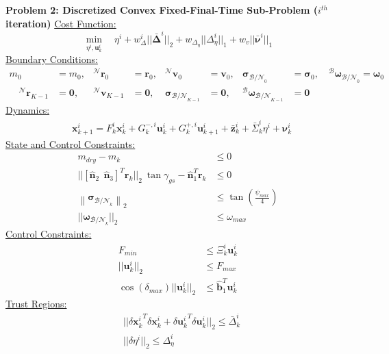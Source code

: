 \clearpage
\begin{mdframed}
\label{problem2}
\textbf{Problem 2: Discretized Convex Fixed-Final-Time Sub-Problem ($i^{th}$ iteration)}
\underline{Cost Function:}
\begin{equation*}
\min_{\eta^i, \mathbf{u}_k^i} \quad \eta^i + w_\Delta^i || \bm{\bar{\Delta}}^i ||_2 + w_{\Delta_\eta} || \Delta_\eta^i ||_1 + w_v || \bar{\bm{\nu}}^i ||_1
\end{equation*}
%
\underline{Boundary Conditions:}  
\begin{align*}
m_0 &= m_0, &^\mathcal{N}\mathbf{r}_0 &= \mathbf{r}_0, & ^\mathcal{N}\mathbf{v}_0 &= \mathbf{v}_0, & \boldsymbol{\sigma}_{\mathcal{B/N}_0} &= {\boldsymbol{\sigma}_0}, \quad ^\mathcal{B}\boldsymbol{\omega}_{\mathcal{B/N}_0} = \boldsymbol{\omega}_0 \\
\quad ^\mathcal{N}\mathbf{r}_{K-1} &= \mathbf{0}, & ^\mathcal{N}\mathbf{v}_{K-1} &= \mathbf{0}, & \boldsymbol{\sigma}_{\mathcal{B/N}_{K-1}} &= \mathbf{0}, & ^\mathcal{B}\boldsymbol{\omega}_{\mathcal{B/N}_{K-1}} &= \mathbf{0}
\end{align*}
%
\underline{Dynamics:}  
\begin{align*}
& \mathbf{x}_{k+1}^i = F_k^i\mathbf{x}_k^i + G^{-,i}_k\mathbf{u}_k^i + G_k^{+,i}\mathbf{u}_{k+1}^i + \bar{\mathbf{z}}^i_k +\bar{\Sigma}_k^i\eta^i + \bm{\nu}_k^i
\end{align*}
%
\underline{State and Control Constraints:}
\begin{align*}
m_{dry} - m_k & \leq 0 \\
|| [\hat{\bm{n}}_2 \ \ \hat{\bm{n}}_3 ]^T \mathbf{r}_k \lvert\lvert_2 \ \tan{\gamma_{gs}}  - \hat{\bm{n}}_1^T \mathbf{r}_k & \leq 0 \\
%
\left \lVert \boldsymbol{\sigma}_{\mathcal{B/N}_k} \right \lVert_2 &\leq \tan \left( \frac{\psi_{max}}{4} \right) \\
%
|| \bm{\omega}_{\mathcal{B/N}_k} ||_2 & \leq \omega_{max}
\end{align*}
%
\underline{Control Constraints:}  
\begin{align*}
F_{min} &\leq \Xi_k^i\mathbf{u}_k^i \\
|| \mathbf{u}_k^i ||_2 &\leq F_{max} \\
\cos(\delta_{max}) || \mathbf{u}_k^i ||_2 &\leq \hat{\bm{b}}_1^T \mathbf{u}_k^i
\end{align*}
%
\underline{Trust Regions:}  
\begin{align*}
& ||{\delta \mathbf{x}_k^i}^T  \delta \mathbf{x}_k^i + {\delta \mathbf{u}_k^i}^T \delta \mathbf{u}_k^i ||_2 \leq \bar{\Delta}_k^i \\
& || \delta \eta^i ||_2 \leq \Delta_\eta^i
\end{align*}
\end{mdframed}

